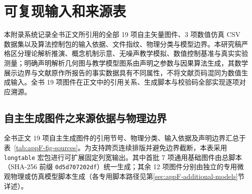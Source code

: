 \chapter{可复现输入和来源表}\label{app:reproducible-inputs}

本附录系统记录全书正文所引用的全部 19 项自主矢量图件、3 项数值仿真 CSV 数据集以及算法控制包的输入依据、文件指纹、物理分类与模型边界。本研究稿严格区分理论解析推演、概念机制示意、无噪声教学模拟、数值控制基准与真实实验测量；明确声明解析几何图与教学模型图系由声明之参数与因果算法生成，其数学展示边界与文献原作所报告的事实数据具有不同属性，不将文献页码混同为数值生成输入。全书 19 项图件在正文中的引用关系、生成脚本与校验码全部实现逐项对应溯源。

\section{自主生成图件之来源依据与物理边界}\label{sec:appF-figures-sources}

全书正文 19 项自主生成图件的引用节号、物理分类、输入依据及声明边界汇总于表~\ref{tab:appF-fig-sources}。为支持跨页连续排版并避免边界截断，本表采用 \texttt{longtable} 宏包进行可扩展固定列宽输出。其中首批 7 项通用基础图件由总脚本 （SHA-256 前缀 \texttt{0d5d707202df}）统一生成；其余 12 项图件分别由独立的专用微观物理或仿真模型脚本生成（各专用脚本路径见第\ref{sec:appF-additional-models}节详述）。

